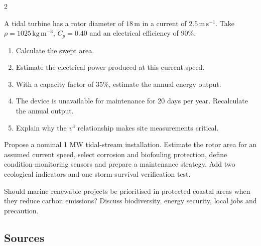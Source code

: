 \begin{multicols}{2}
\begin{applicationexercise}
A tidal turbine has a rotor diameter of $18\,\mathrm{m}$ in a current of $2.5\,\mathrm{m\,s^{-1}}$.
Take $\rho=1025\,\mathrm{kg\,m^{-3}}$, $C_p=0.40$ and an electrical efficiency of $90\%$.
\begin{enumerate}
\item Calculate the swept area.
\item Estimate the electrical power produced at this current speed.
\item With a capacity factor of $35\%$, estimate the annual energy output.
\item The device is unavailable for maintenance for 20 days per year. Recalculate the annual output.
\item Explain why the $v^3$ relationship makes site measurements critical.
\end{enumerate}
\end{applicationexercise}

\begin{engineeringchallenge}
Propose a nominal 1 MW tidal-stream installation. Estimate the rotor area for an assumed current speed,
select corrosion and biofouling protection, define condition-monitoring sensors and prepare a maintenance
strategy. Add two ecological indicators and one storm-survival verification test.
\end{engineeringchallenge}

\begin{speaking}
Should marine renewable projects be prioritised in protected coastal areas when they reduce carbon
emissions? Discuss biodiversity, energy security, local jobs and precaution.
\end{speaking}
\end{multicols}

\subsection*{Sources}
